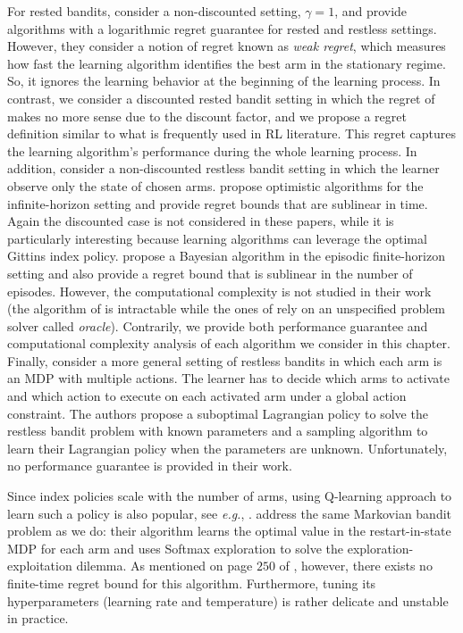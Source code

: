 For rested bandits, \cite{tekin2012online} consider a non-discounted setting, $\gamma=1$, and provide algorithms with a logarithmic regret guarantee for rested and restless settings.
However, they consider a notion of regret known as \emph{weak regret}, which measures how fast the learning algorithm identifies the best arm in the stationary regime. So, it ignores the learning behavior at the beginning of the learning process.
In contrast, we consider a discounted rested bandit setting in which the regret of \cite{tekin2012online} makes no more sense due to the discount factor, and we propose a regret definition similar to what is frequently used in RL literature.
This regret captures the learning algorithm's performance during the whole learning process.
In addition, \cite{ortner2012regret, jung2019regret, wang2020restless} consider a non-discounted restless bandit setting in which the learner observe only the state of chosen arms. \cite{ortner2012regret, wang2020restless} propose optimistic algorithms for the infinite-horizon setting and provide regret bounds that are sublinear in time. Again the discounted case is not considered in these papers, while it is particularly interesting because learning algorithms can leverage the optimal Gittins index policy.
\cite{jung2019regret} propose a Bayesian algorithm in the episodic finite-horizon setting and also provide a regret bound that is sublinear in the number of episodes. However, the computational complexity is not studied in their work (the algorithm of \cite{ortner2012regret} is intractable while the ones of \cite{jung2019regret, wang2020restless} rely on an unspecified problem solver called \emph{oracle}).
Contrarily, we provide both performance guarantee and computational complexity analysis of each algorithm we consider in this chapter.
Finally, \cite{killian2021beyond} consider a more general setting of restless bandits in which each arm is an MDP with multiple actions. The learner has to decide which arms to activate and which action to execute on each activated arm under a global action constraint. The authors propose a suboptimal Lagrangian policy to solve the restless bandit problem with known parameters and a sampling algorithm to learn their Lagrangian policy when the parameters are unknown. Unfortunately, no performance guarantee is provided in their work.

Since index policies scale with the number of arms, using Q-learning approach to learn such a policy is also popular, see \emph{e.g.},
\cite{avrachenkov2022whittle,fu2019towards,duff1995q}. \cite{duff1995q} address the same Markovian bandit
problem as we do: their algorithm learns the optimal value in the
restart-in-state MDP \cite{katehakis1987multi} for each
arm and uses Softmax exploration to solve the exploration-exploitation
dilemma. As mentioned on page $250$ of
\cite{auer2002finite}, however, there exists no
finite-time regret bound for this algorithm. Furthermore, tuning
its hyperparameters (learning rate and temperature) is rather delicate and
unstable in practice. 

